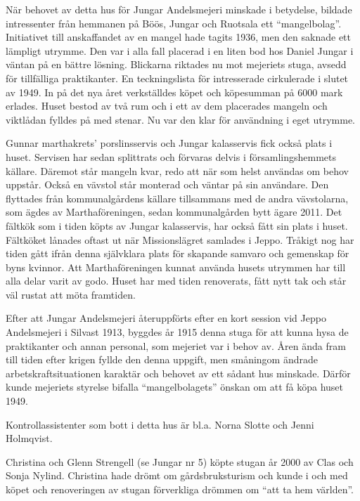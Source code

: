 När behovet av detta hus för Jungar Andelsmejeri minskade i betydelse, bildade intressenter från hemmanen på Böös, Jungar och Ruotsala ett ``mangelbolag''. Initiativet till anskaffandet av en mangel hade tagits 1936, men den saknade ett lämpligt utrymme. Den var i alla fall placerad i en liten bod hos Daniel Jungar i väntan på en bättre lösning. Blickarna riktades nu mot mejeriets stuga, avsedd för tillfälliga praktikanter. En teckningslista för intresserade cirkulerade i slutet av 1949. In på det nya året verkställdes köpet och köpesumman på 6000 mark erlades. Huset bestod av två rum och i ett av dem placerades mangeln och viktlådan fylldes på med stenar. Nu var den klar för användning i eget utrymme.


Gunnar marthakrets' porslinsservis och Jungar kalasservis fick också plats i huset. Servisen har sedan splittrats och förvaras delvis i församlingshemmets källare. Däremot står mangeln kvar, redo att när som helst användas om behov uppstår. Också en vävstol står monterad och väntar på sin användare. Den flyttades från kommunalgårdens källare tillsammans med de andra vävstolarna, som ägdes av Marthaföreningen, sedan kommunalgården bytt ägare 2011. Det fältkök som i tiden köpts av Jungar kalasservis, har också fått sin plats i huset. Fältköket lånades oftast ut när Missionslägret samlades i Jeppo. Tråkigt nog har tiden gått ifrån denna självklara plats för skapande samvaro och gemenskap för byns kvinnor. Att Marthaföreningen kunnat använda husets utrymmen har till alla delar varit av godo. Huset har med tiden renoverats, fått nytt tak och står väl rustat att möta framtiden.


Efter att Jungar Andelsmejeri återuppförts efter en kort session vid Jeppo Andelsmejeri i Silvast 1913, byggdes år 1915 denna stuga för att kunna hysa de praktikanter och annan personal, som mejeriet var i behov av. Åren ända fram till tiden efter krigen fyllde den denna uppgift, men småningom ändrade arbetskraftsituationen karaktär och behovet av ett sådant hus minskade. Därför kunde mejeriets styrelse bifalla ``mangelbolagets'' önskan om att få köpa huset 1949.

Kontrollassistenter som bott i detta hus är bl.a. Norna Slotte och Jenni Holmqvist.



Christina och Glenn Strengell (se Jungar nr 5) köpte stugan år 2000 av Clas och Sonja Nylind. Christina hade drömt om gårdsbruksturism och kunde i och med köpet och renoveringen av stugan förverkliga drömmen om ``att ta hem världen''.

